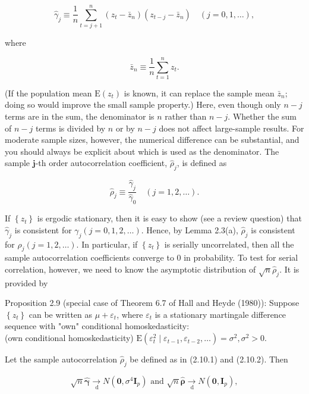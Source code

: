 \documentclass[10pt]{article}
\begin{document}
\begin{equation*}
\hat{\gamma}_{j} \equiv \frac{1}{n} \sum_{t=j+1}^{n}\left(z_{t}-\bar{z}_{n}\right)\left(z_{t-j}-\bar{z}_{n}\right) \quad(j=0,1, \ldots), \tag{2.10.1}
\end{equation*}


where

$$
\bar{z}_{n} \equiv \frac{1}{n} \sum_{t=1}^{n} z_{t} .
$$

(If the population mean $\mathrm{E}\left(z_{t}\right)$ is known, it can replace the sample mean $\bar{z}_{n}$; doing so would improve the small sample property.) Here, even though only $n-j$ terms are in the sum, the denominator is $n$ rather than $n-j$. Whether the sum of $n-j$ terms is divided by $n$ or by $n-j$ does not affect large-sample results. For moderate sample sizes, however, the numerical difference can be substantial, and you should always be explicit about which is used as the denominator. The sample $\boldsymbol{j}$-th order autocorrelation coefficient, $\hat{\rho}_{j}$, is defined as


\begin{equation*}
\hat{\rho}_{j} \equiv \frac{\hat{\gamma}_{j}}{\hat{\gamma}_{0}} \quad(j=1,2, \ldots) . \tag{2.10.2}
\end{equation*}


If $\left\{z_{t}\right\}$ is ergodic stationary, then it is easy to show (see a review question) that $\hat{\gamma}_{j}$ is consistent for $\gamma_{j}(j=0,1,2, \ldots)$. Hence, by Lemma 2.3(a), $\hat{\rho}_{j}$ is consistent for $\rho_{j}(j=1,2, \ldots)$. In particular, if $\left\{z_{t}\right\}$ is serially uncorrelated, then all the sample autocorrelation coefficients converge to 0 in probability. To test for serial correlation, however, we need to know the asymptotic distribution of $\sqrt{n} \hat{\rho}_{j}$. It is provided by

Proposition 2.9 (special case of Theorem 6.7 of Hall and Heyde (1980)): Suppose $\left\{z_{t}\right\}$ can be written as $\mu+\varepsilon_{t}$, where $\varepsilon_{t}$ is a stationary martingale difference sequence with "own" conditional homoskedasticity:\\
(own conditional homoskedasticity) $\mathrm{E}\left(\varepsilon_{t}^{2} \mid \varepsilon_{t-1}, \varepsilon_{t-2}, \ldots\right)=\sigma^{2}, \sigma^{2}>0$.

Let the sample autocorrelation $\hat{\rho}_{j}$ be defined as in (2.10.1) and (2.10.2). Then

$$
\sqrt{n} \hat{\boldsymbol{\gamma}} \underset{\mathrm{~d}}{\rightarrow} N\left(\mathbf{0}, \sigma^{4} \mathbf{I}_{p}\right) \text { and } \sqrt{n} \hat{\boldsymbol{\rho}} \underset{\mathrm{~d}}{\rightarrow} N\left(\mathbf{0}, \mathbf{I}_{p}\right),
$$
\end{document}
